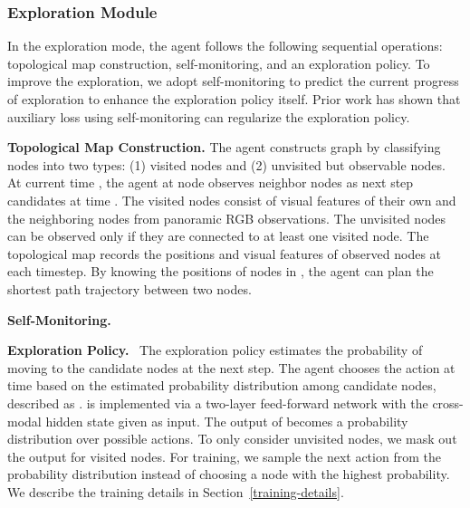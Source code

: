 \documentclass[10pt,twocolumn,letterpaper]{article}
\begin{document}
\subsubsection{Exploration Module}\label{sec:exploration-module}
\vspace{-0.2cm}
In the exploration mode, the agent follows the following sequential operations: topological map construction, self-monitoring, and an exploration policy. To improve the exploration, we adopt self-monitoring \cite{ma2019self} to predict the current progress of exploration to enhance the exploration policy itself. Prior work \cite{ma2019self, ma2019regretful} has shown that auxiliary loss using self-monitoring can regularize the exploration policy. \\
\vspace{-0.3cm}

\noindent\textbf{Topological Map Construction.}
The agent constructs graph  by classifying nodes into two types: (1) visited nodes and (2) unvisited but observable nodes. At current time , the agent at node  observes  neighbor nodes as next step candidates at time . The visited nodes consist of visual features of their own and the neighboring nodes from panoramic RGB observations. The unvisited nodes can be observed only if they are connected to at least one visited node. The topological map records the positions and visual features of observed nodes at each timestep. By knowing the positions of nodes in , the agent can plan the shortest path trajectory between two nodes.

\noindent\textbf{Self-Monitoring.}
\font=2.5pt

\font=2.2pt
\noindent\textbf{Exploration Policy.}~\label{exploration-policy} The exploration policy  estimates the probability of moving to the candidate nodes at the next step. The agent chooses the action  at time  based on the estimated probability distribution among candidate nodes, described as .  is implemented via a two-layer feed-forward network with the cross-modal hidden state  given as input. The output of  becomes a probability distribution over possible actions. To only consider unvisited nodes, we mask out the output for visited nodes. For training, we sample the next action from the probability distribution instead of choosing a node with the highest probability. We describe the training details in Section~\ref{training-details}.
\font=2.5pt
\vspace{-0.4cm}
\end{document}
